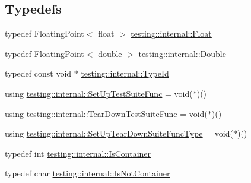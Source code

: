 \subsection*{Typedefs}
\begin{DoxyCompactItemize}
\item 
typedef Floating\+Point$<$ float $>$ \mbox{\hyperlink{namespacetesting_1_1internal_a97de600d6dbfffe7091b878ac4b3a9a7}{testing\+::internal\+::\+Float}}
\item 
typedef Floating\+Point$<$ double $>$ \mbox{\hyperlink{namespacetesting_1_1internal_a92debc9f055b7e7e1e4e861c5ae1c67a}{testing\+::internal\+::\+Double}}
\item 
typedef const void $\ast$ \mbox{\hyperlink{namespacetesting_1_1internal_a38c435cbab5f8b784e2e7f3356cab242}{testing\+::internal\+::\+Type\+Id}}
\item 
using \mbox{\hyperlink{namespacetesting_1_1internal_a028e9455ad22171feabf84fe46329c92}{testing\+::internal\+::\+Set\+Up\+Test\+Suite\+Func}} = void($\ast$)()
\item 
using \mbox{\hyperlink{namespacetesting_1_1internal_ab58aba5acd47d329b72a1d10c7b61648}{testing\+::internal\+::\+Tear\+Down\+Test\+Suite\+Func}} = void($\ast$)()
\item 
using \mbox{\hyperlink{namespacetesting_1_1internal_a754d337f5d643225115fb28f6b1d6fb1}{testing\+::internal\+::\+Set\+Up\+Tear\+Down\+Suite\+Func\+Type}} = void($\ast$)()
\item 
typedef int \mbox{\hyperlink{namespacetesting_1_1internal_ad8f0c2883245f1df2a53618a49f0deb3}{testing\+::internal\+::\+Is\+Container}}
\item 
typedef char \mbox{\hyperlink{namespacetesting_1_1internal_abf080521ce135deb510e0a7830fd3d33}{testing\+::internal\+::\+Is\+Not\+Container}}
\end{DoxyCompactItemize}
